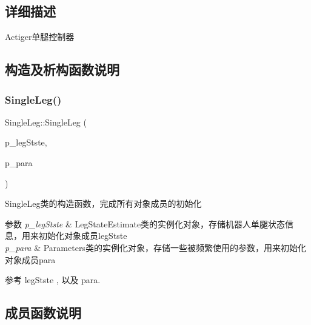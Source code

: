 \subsection{详细描述}
Actiger单腿控制器 

\subsection{构造及析构函数说明}
\mbox{\label{classquadruped_1_1SingleLeg_a3517b91ff7317237d4e7e6713ef31d83}} 
\subsubsection{\texorpdfstring{Single\+Leg()}{SingleLeg()}}
{\footnotesize\ttfamily Single\+Leg\+::\+Single\+Leg (\begin{DoxyParamCaption}\item[{\hyperlink{classquadruped_1_1LegStateEstimate}{Leg\+State\+Estimate} $\ast$}]{p\+\_\+leg\+Stste,  }\item[{\hyperlink{classquadruped_1_1Parameters}{Parameters} $\ast$}]{p\+\_\+para }\end{DoxyParamCaption})\hspace{0.3cm}{\ttfamily [explicit]}}



Single\+Leg类的构造函数，完成所有对象成员的初始化 


\begin{DoxyParams}{参数}
{\em p\+\_\+leg\+Stste} & Leg\+State\+Estimate类的实例化对象，存储机器人单腿状态信息，用来初始化对象成员leg\+Stste \\
\hline
{\em p\+\_\+para} & Parameters类的实例化对象，存储一些被频繁使用的参数，用来初始化对象成员para \\
\hline
\end{DoxyParams}


参考 leg\+Stste , 以及 para.



\subsection{成员函数说明}
\mbox{\label{classquadruped_1_1SingleLeg_a2162ecb433c3583bf3c3ca1289dc9472}} 
